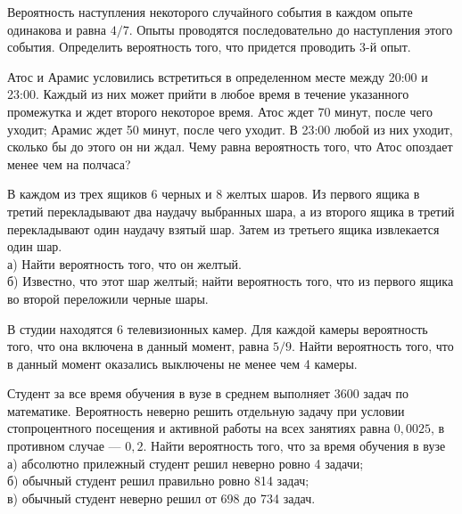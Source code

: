 \newpage\setcounter{zad}{0}



\begin{zkrW}{20}\noindent 
	Вероятность наступления некоторого случайного события в каждом опыте одинакова и равна $4/7$. Опыты проводятся последовательно до наступления этого события. Определить вероятность того, что придется проводить 3-й опыт.
 
\end{zkrW}

\begin{zkrW}{20}\noindent 
	Атос и Арамис условились встретиться в определенном месте между 20:00 и 23:00. Каждый из них может прийти в любое время в течение указанного промежутка и ждет второго некоторое время. Атос ждет 70 минут, после чего уходит; Арамис ждет 50 минут, после чего уходит. В 23:00 любой из них уходит, сколько бы до этого он ни ждал. Чему равна вероятность того, что Атос опоздает менее чем на полчаса?
 
\end{zkrW}

\begin{zkrW}{20}\noindent 
	В каждом из трех ящиков 6 черных и 8 желтых шаров. Из первого ящика в третий перекладывают два наудачу выбранных шара, а из второго ящика в третий перекладывают один наудачу взятый шар. Затем из третьего ящика извлекается один шар. \\ \indent а) Найти вероятность того, что он желтый. \\ \indent б) Известно, что этот шар желтый; найти вероятность того, что из первого ящика во второй переложили черные шары.
 
\end{zkrW}

\begin{zkrW}{20}\noindent 
	В студии находятся 6 телевизионных камер. Для каждой камеры вероятность того, что она включена в данный момент, равна $5/9$. Найти вероятность того, что в данный момент оказались выключены не менее чем 4 камеры.
 
\end{zkrW}

\begin{zkrW}{20}\noindent 
	Студент за все время обучения в вузе в среднем выполняет 3600 задач по математике. Вероятность неверно решить отдельную задачу при условии стопроцентного посещения и активной работы на всех занятиях равна $0{,}0025$, в противном случае --- $0{,}2$. Найти вероятность того, что за время обучения в вузе \\ \indent а) абсолютно прилежный студент решил неверно ровно 4 задачи; \\ \indent б) обычный студент решил правильно ровно 814 задач; \\ \indent в) обычный студент неверно решил от 698 до 734 задач.
 
\end{zkrW}

